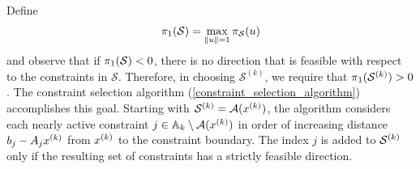 \documentclass{article}
\begin{document}
Define 
\begin{align}
{\pi_1}(\mathcal S) = \max_{\|u\| = 1} \pi_{\mathcal S}(u)
 \label{define_alpha_two} 
\end{align}
and observe that if ${\pi_1}(\mathcal S) < 0$, there is no direction that is feasible with respect to the constraints in $\mathcal{S}$.    Therefore, in choosing $\mathcal{S}^{(k)}$, we require that ${\pi_1}(\mathcal{S}^{(k)}) > 0$.    The constraint selection algorithm (\cref{constraint_selection_algorithm}) accomplishes this goal.  Starting with $\mathcal{S}^{(k)}={\mathcal A}(x^{(k)})$, the algorithm considers each nearly active constraint $j \in {\mathbb A_{k}} \setminus {\mathcal A}(x^{(k)})$ in order of increasing distance  $b_j-A_j x^{(k)}$ from $x^{(k)}$ to the constraint boundary.   The index $j$ is added to $\mathcal{S}^{(k)}$ only if the resulting set of constraints has a strictly feasible direction.  
\end{document}
